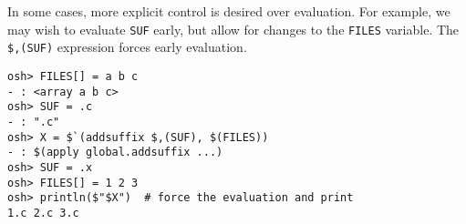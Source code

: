 In some cases, more explicit control is desired over evaluation.  For example, we may wish to
evaluate \verb+SUF+ early, but allow for changes to the \verb+FILES+ variable.  The \verb+$,(SUF)+
expression forces early evaluation.

\begin{verbatim}
osh> FILES[] = a b c
- : <array a b c>
osh> SUF = .c
- : ".c"
osh> X = $`(addsuffix $,(SUF), $(FILES))
- : $(apply global.addsuffix ...)
osh> SUF = .x
osh> FILES[] = 1 2 3
osh> println($"$X")  # force the evaluation and print
1.c 2.c 3.c
\end{verbatim}

